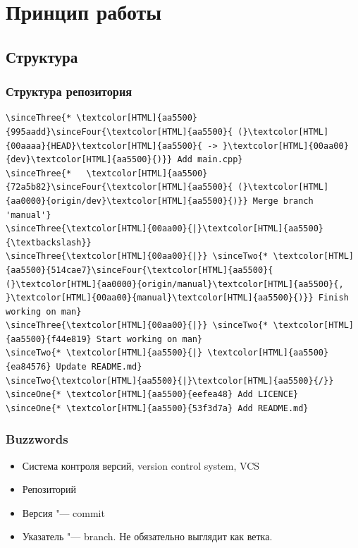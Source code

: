 \documentclass[pdf,russian]{beamer}
\begin{document}
\section{Принцип работы}

\subsection{Структура}

\begin{frame}[fragile]
    \frametitle{Структура репозитория}


    \newcommand{\sinceOne}[1]{\onslide<2->{#1}}
    \newcommand{\sinceTwo}[1]{\onslide<4->{#1}}
    \newcommand{\sinceThree}[1]{\onslide<6->{#1}}
    \newcommand{\sinceFour}[1]{\onslide<8->{#1}}

    \begin{block}{}
        \begin{Verbatim}[commandchars=\\\{\}]
\sinceThree{* \textcolor[HTML]{aa5500}{995aadd}\sinceFour{\textcolor[HTML]{aa5500}{ (}\textcolor[HTML]{00aaaa}{HEAD}\textcolor[HTML]{aa5500}{ -> }\textcolor[HTML]{00aa00}{dev}\textcolor[HTML]{aa5500}{)}} Add main.cpp}
\sinceThree{*   \textcolor[HTML]{aa5500}{72a5b82}\sinceFour{\textcolor[HTML]{aa5500}{ (}\textcolor[HTML]{aa0000}{origin/dev}\textcolor[HTML]{aa5500}{)}} Merge branch 'manual'}
\sinceThree{\textcolor[HTML]{00aa00}{|}\textcolor[HTML]{aa5500}{\textbackslash}}
\sinceThree{\textcolor[HTML]{00aa00}{|}} \sinceTwo{* \textcolor[HTML]{aa5500}{514cae7}\sinceFour{\textcolor[HTML]{aa5500}{ (}\textcolor[HTML]{aa0000}{origin/manual}\textcolor[HTML]{aa5500}{, }\textcolor[HTML]{00aa00}{manual}\textcolor[HTML]{aa5500}{)}} Finish working on man}
\sinceThree{\textcolor[HTML]{00aa00}{|}} \sinceTwo{* \textcolor[HTML]{aa5500}{f44e819} Start working on man}
\sinceTwo{* \textcolor[HTML]{aa5500}{|} \textcolor[HTML]{aa5500}{ea84576} Update README.md}
\sinceTwo{\textcolor[HTML]{aa5500}{|}\textcolor[HTML]{aa5500}{/}}
\sinceOne{* \textcolor[HTML]{aa5500}{eefea48} Add LICENCE}
\sinceOne{* \textcolor[HTML]{aa5500}{53f3d7a} Add README.md}
        \end{Verbatim}
    \end{block}
\end{frame}

\begin{frame}
    \frametitle{Buzzwords}
    \begin{itemize}
        \pause
        \item Система контроля версий, version control system, VCS
        \pause
        \item Репозиторий
        \pause
        \item Версия "--- commit
        \pause
        \item Указатель "--- branch. \pause Не обязательно выглядит как ветка.
    \end{itemize}
\end{frame}
\end{document}
